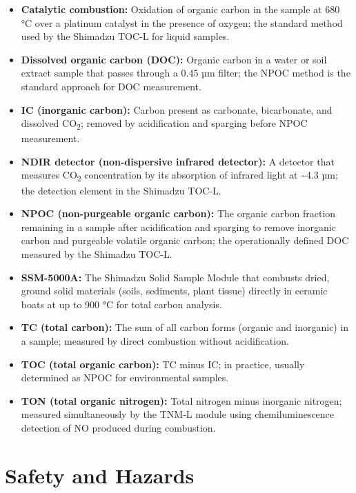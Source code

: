 \documentclass[
  11pt,
  letterpaper,
]{article}
\providecommand{\tightlist}{%
  \setlength{\itemsep}{0pt}\setlength{\parskip}{0pt}}
\begin{document}
\begin{itemize}
\tightlist
\item
  \textbf{Catalytic combustion:} Oxidation of organic carbon in the
  sample at 680 °C over a platinum catalyst in the presence of oxygen;
  the standard method used by the Shimadzu TOC-L for liquid samples.
\item
  \textbf{Dissolved organic carbon (DOC):} Organic carbon in a water or
  soil extract sample that passes through a 0.45 µm filter; the NPOC
  method is the standard approach for DOC measurement.
\item
  \textbf{IC (inorganic carbon):} Carbon present as carbonate,
  bicarbonate, and dissolved CO\textsubscript{2}; removed by
  acidification and sparging before NPOC measurement.
\item
  \textbf{NDIR detector (non-dispersive infrared detector):} A detector
  that measures CO\textsubscript{2} concentration by its absorption of
  infrared light at \textasciitilde4.3 µm; the detection element in the
  Shimadzu TOC-L.
\item
  \textbf{NPOC (non-purgeable organic carbon):} The organic carbon
  fraction remaining in a sample after acidification and sparging to
  remove inorganic carbon and purgeable volatile organic carbon; the
  operationally defined DOC measured by the Shimadzu TOC-L.
\item
  \textbf{SSM-5000A:} The Shimadzu Solid Sample Module that combusts
  dried, ground solid materials (soils, sediments, plant tissue)
  directly in ceramic boats at up to 900 °C for total carbon analysis.
\item
  \textbf{TC (total carbon):} The sum of all carbon forms (organic and
  inorganic) in a sample; measured by direct combustion without
  acidification.
\item
  \textbf{TOC (total organic carbon):} TC minus IC; in practice, usually
  determined as NPOC for environmental samples.
\item
  \textbf{TON (total organic nitrogen):} Total nitrogen minus inorganic
  nitrogen; measured simultaneously by the TNM-L module using
  chemiluminescence detection of NO produced during combustion.
\end{itemize}

\section{Safety and Hazards}\label{safety-and-hazards}
\end{document}
